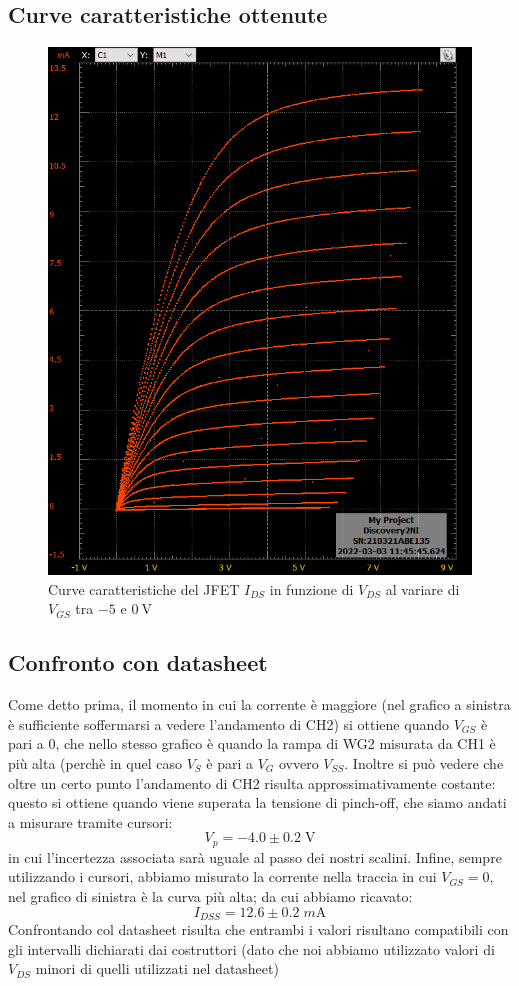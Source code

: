 \documentclass[10pt, a4paper, italian]{article}
\begin{document}
\subsection{Curve caratteristiche ottenute}
\begin{figure}[htbp]
    \centering
	\includegraphics[scale=0.4]{vgs}
    \caption{Curve caratteristiche del JFET $I_{DS}$ in funzione di $V_{DS}$
    al variare di $V_{GS}$ tra $-5$ e $\SI{0}{\V}$
    \label{fig: IDS-VDS}}
\end{figure}

\subsection{Confronto con datasheet}
Come detto prima, il momento in cui la corrente è maggiore (nel grafico a sinistra è sufficiente soffermarsi a vedere l'andamento di CH2) si ottiene quando $V_{GS}$ è pari a 0, che nello stesso grafico è quando la rampa di WG2 misurata da CH1 è più alta (perchè in quel caso $V_S$ è pari a $V_G$ ovvero $V_{SS}$.
Inoltre si può vedere che oltre un certo punto l'andamento di CH2 risulta approssimativamente costante: questo si ottiene quando viene superata la tensione di pinch-off, che siamo andati a misurare tramite cursori:
\[
V_p = -4.0 \pm 0.2 \; \si{\V}
\]
in cui l'incertezza associata sarà uguale al passo dei nostri scalini.
Infine, sempre utilizzando i cursori, abbiamo misurato la corrente nella traccia in cui $V_{GS} = 0$, nel grafico di sinistra è la curva più alta; da cui abbiamo ricavato:
\[
I_{DSS} = 12.6 \pm 0.2 \; \si{m\A}
\]
Confrontando col datasheet risulta che entrambi i valori risultano compatibili con gli intervalli dichiarati dai costruttori (dato che noi abbiamo utilizzato valori di $V_{DS}$ minori di quelli utilizzati nel datasheet)
\end{document}

